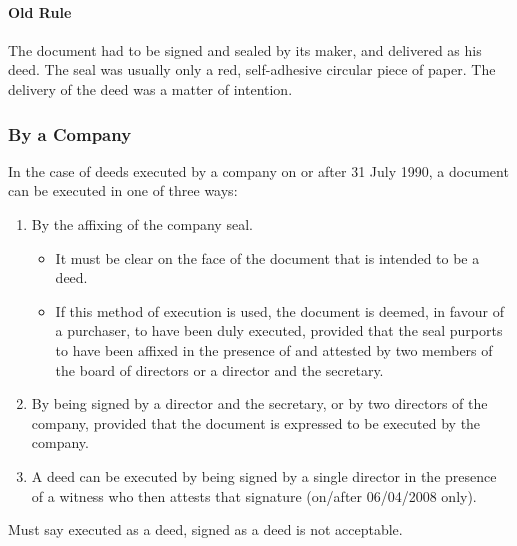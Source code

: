 \documentclass[
]{article}
\newenvironment{Shaded}{}{}
\newcommand{\NormalTok}[1]{#1}
\providecommand{\tightlist}{%
  \setlength{\itemsep}{0pt}\setlength{\parskip}{0pt}}
\begin{document}
\hypertarget{old-rule}{%
\paragraph{Old Rule}\label{old-rule}}

The document had to be signed and sealed by its maker, and delivered as
his deed. The seal was usually only a red, self-adhesive circular piece
of paper. The delivery of the deed was a matter of intention.

\hypertarget{by-a-company}{%
\subsubsection{By a Company}\label{by-a-company}}

In the case of deeds executed by a company on or after 31 July 1990, a
document can be executed in one of three ways:

\begin{enumerate}
\def\labelenumi{\arabic{enumi}.}
\tightlist
\item
  By the affixing of the company seal.

  \begin{itemize}
  \tightlist
  \item
    It must be clear on the face of the document that is intended to be
    a deed.
  \item
    If this method of execution is used, the document is deemed, in
    favour of a purchaser, to have been duly executed, provided that the
    seal purports to have been affixed in the presence of and attested
    by two members of the board of directors or a director and the
    secretary.
  \end{itemize}
\item
  By being signed by a director and the secretary, or by two directors
  of the company, provided that the document is expressed to be executed
  by the company.
\item
  A deed can be executed by being signed by a single director in the
  presence of a witness who then attests that signature (on/after
  06/04/2008 only).
\end{enumerate}

\begin{Shaded}
\begin{Highlighting}[]
\NormalTok{Must say \textquotesingle{}executed as a deed\textquotesingle{}, \textquotesingle{}signed as a deed\textquotesingle{} is not acceptable.}
\end{Highlighting}
\end{Shaded}
\end{document}
